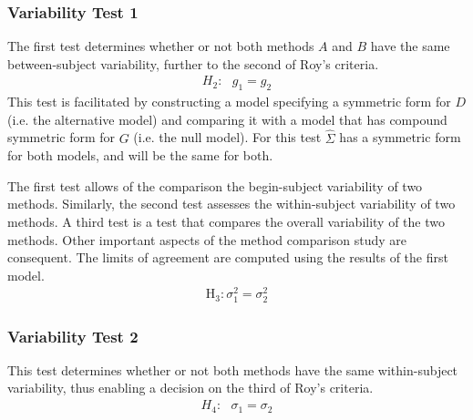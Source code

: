 \documentclass[12pt, a4paper]{report}
\theoremstyle{plain}
\theoremstyle{definition}
\theoremstyle{remark}
\begin{document}
	
	

	
	\subsubsection{Variability Test 1}
	The first test determines whether or not both methods $A$ and $B$ have the same between-subject variability, further to the second of Roy's criteria.
	\begin{eqnarray*}
		H_{2}: \mbox{ }g_{1}  = g_{2} 
	\end{eqnarray*}
	This test is facilitated by constructing a model specifying a symmetric form for $D$ (i.e. the alternative model) and comparing it with a model that has compound symmetric form for $G$ (i.e. the null model). For this test ${\hat{\Sigma}}$ has a symmetric form for both models, and will be the same for both.
	
	
	
	The first test allows of the comparison the begin-subject variability of two methods. Similarly, the second test assesses the within-subject variability of two methods. A third test is a test that compares the overall variability of the two methods. Other important aspects of the method comparison study are consequent. The limits of agreement are computed using the results of the first model.
	\begin{eqnarray*}
		\operatorname{H_3} : \sigma^2_1 = \sigma^2_2 
	\end{eqnarray*}
	
	\subsubsection*{Variability Test 2}

This test determines whether or not both methods have the same within-subject variability, thus enabling a decision on the third of Roy's criteria.
\begin{eqnarray*}
		H_{4}: \mbox{ }\sigma_{1}  = \sigma_{2} 
\end{eqnarray*}
	
\end{document}
